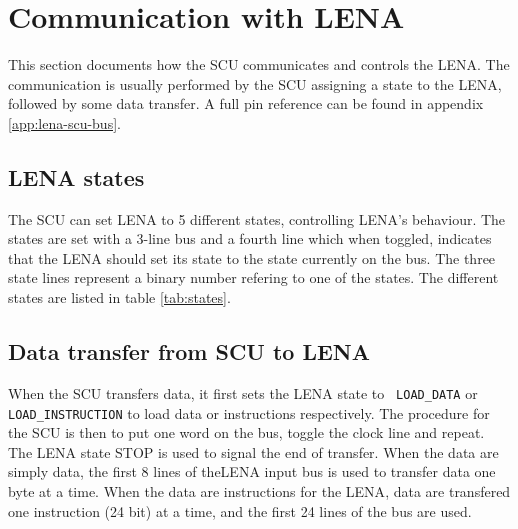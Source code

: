 \section{Communication with LENA}
\label{sec:SCU-LENA-communication}

This section documents how the \ac{SCU} communicates and controls the
\ac{LENA}. The communication is usually performed by the \ac{SCU} assigning a
state to the \ac{LENA}, followed by some data transfer. A full pin reference can
be found in appendix \ref{app:lena-scu-bus}.

\subsection{LENA states}

The \ac{SCU} can set \ac{LENA} to 5 different states, controlling \ac{LENA}'s
behaviour. The states are set with a 3-line bus and a fourth line which when
toggled, indicates that the \ac{LENA} should set its state to the state
currently on the bus. The three state lines represent a binary number refering
to one of the states. The different states are listed in table \ref{tab:states}.



\subsection{Data transfer from SCU to LENA}
When the \ac{SCU} transfers data, it first sets the \ac{LENA} state to {\tt
  LOAD\_DATA} or {\tt LOAD\_INSTRUCTION} to load data or instructions
respectively. The procedure for the \ac{SCU} is then to put one word on the bus,
toggle the clock line and repeat. The \ac{LENA} state STOP is used to signal the
end of transfer. When the data are simply data, the first 8 lines of
the\ac{LENA} input bus is used to transfer data one byte at a time. When the
data are instructions for the \ac{LENA}, data are transfered one instruction (24
bit) at a time, and the first 24 lines of the bus are used.



